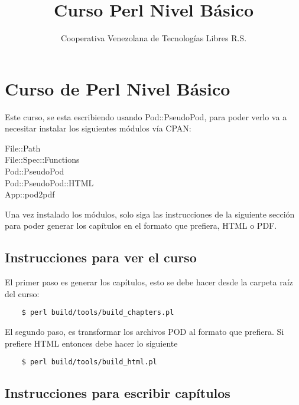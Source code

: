 \documentclass[spanish]{article}
\author{Cooperativa Venezolana de Tecnologías Libres R.S.}
\title{Curso Perl Nivel Básico}
\begin{document}
\maketitle 

\section{Curso de Perl Nivel Básico\label{Curso_de_Perl_Nivel_B_sico}}


Este curso, se esta escribiendo usando Pod::PseudoPod, para poder verlo va a
necesitar instalar los siguientes módulos vía CPAN:

\begin{description}

\item[{File::Path}] \mbox{}
\item[{File::Spec::Functions}] \mbox{}
\item[{Pod::PseudoPod}] \mbox{}
\item[{Pod::PseudoPod::HTML}] \mbox{}
\item[{App::pod2pdf}] \mbox{}\end{description}


Una vez instalado los módulos, solo siga las instrucciones de la siguiente
sección para poder generar los capítulos en el formato que prefiera, HTML o 
PDF.

\subsection*{Instrucciones para ver el curso\label{Instrucciones_para_ver_el_curso}}


El primer paso es generar los capítulos, esto se debe hacer desde la carpeta
raíz del curso:

\begin{verbatim}
    $ perl build/tools/build_chapters.pl
\end{verbatim}


El segundo paso, es transformar los archivos POD al formato que prefiera. Si
prefiere HTML entonces debe hacer lo siguiente

\begin{verbatim}
    $ perl build/tools/build_html.pl
\end{verbatim}
\subsection*{Instrucciones para escribir capítulos\label{Instrucciones_para_escribir_cap_tulos}}
\end{document}
